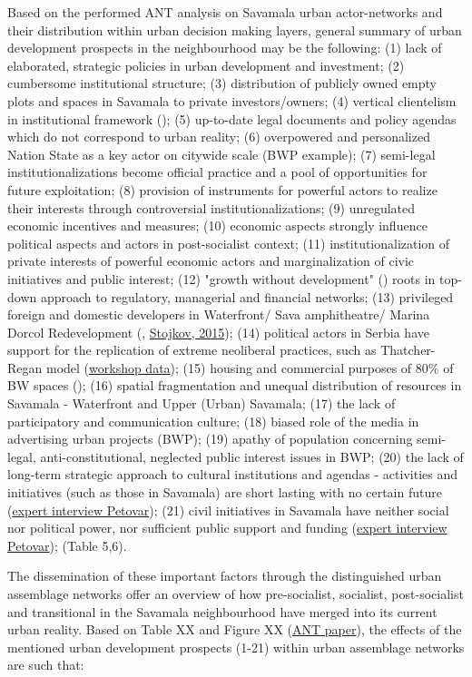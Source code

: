 \documentclass[11pt]{report}
\begin{document}
Based on the performed ANT analysis on Savamala urban actor-networks and their distribution within urban decision making layers, general summary of urban development prospects in the neighbourhood may be the following:
(1) lack of elaborated, strategic policies in urban development and investment;
(2) cumbersome institutional structure;
(3) distribution of publicly owned empty plots and spaces in Savamala to private investors/owners;
(4) vertical clientelism in institutional framework (\cite{Vujovic and Petrovic, 2007});
(5) up-to-date legal documents and policy agendas which do not correspond to urban reality;
(6) overpowered and personalized Nation State as a key actor on citywide scale (BWP example);
(7) semi-legal institutionalizations become official practice and a pool of opportunities for future exploitation;
(8) provision of instruments for powerful actors to realize their interests through controversial institutionalizations;
(9) unregulated economic incentives and measures;
(10) economic aspects strongly influence political aspects and actors in post-socialist context;
(11) institutionalization of private interests of powerful economic actors and marginalization of civic initiatives and public interest;
(12) "growth without development" (\cite{Vujosevic and Maricic, 2012}) roots in top-down approach to regulatory, managerial and financial networks;
(13) privileged foreign and domestic developers in Waterfront/ Sava amphitheatre/ Marina Dorcol Redevelopment (\cite{Djordjevic and Dabovic, 2009}, \href{}{Stojkov, 2015});
(14) political actors in Serbia have support for the replication of extreme neoliberal practices, such as Thatcher-Regan model (\href{}{workshop data});
(15) housing and commercial purposes of 80\% of BW spaces (\cite{Zekovic et al., 2016}); 
(16) spatial fragmentation and unequal distribution of resources in Savamala - Waterfront and Upper (Urban) Savamala;
(17) the lack of participatory and communication culture;
(18) biased role of the media in advertising urban projects (BWP);
(19) apathy of population concerning semi-legal, anti-constitutional, neglected public interest issues in BWP;
(20) the lack of long-term strategic approach to cultural institutions and agendas - activities and initiatives (such as those in Savamala) are short lasting with no certain future (\href{}{expert interview Petovar});
(21) civil initiatives in Savamala have neither social nor political power, nor sufficient public support and funding (\href{}{expert interview Petovar});
(Table 5,6). 

The dissemination of these important factors through the distinguished urban assemblage networks offer an overview of how pre-socialist, socialist, post-socialist and transitional in the Savamala neighbourhood have merged into its current urban reality.
Based on Table XX and Figure XX (\href{}{ANT paper}), the effects of the mentioned urban development prospects (1-21) within urban assemblage networks are such that:
\\
\end{document}
